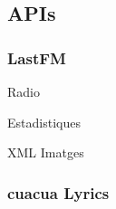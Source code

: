 \subsection{APIs}

\subsubsection{LastFM}

Radio

Estadistiques

XML Imatges


\subsubsection{cuacua Lyrics}


